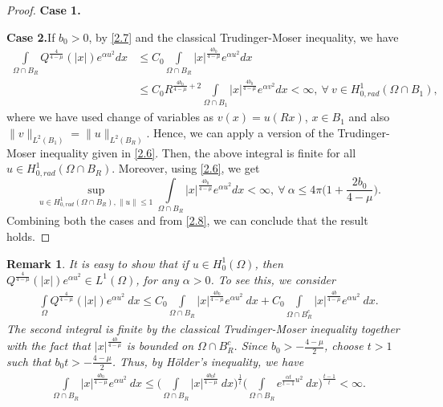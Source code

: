 \documentclass[11pt]{amsart}
\numberwithin{equation}{section}
\newtheorem{rem}{Remark}
\newenvironment{case}[1]{\par\noindent\textbf{Case 1.}\space#1}{}
\newenvironment{case2}[1]{\par\noindent\textbf{Case 2.}\space#1}{}
\newcommand{\h}{H^1_0(\Omega)}
\newcommand{\1}{\frac{1}{2}}
\begin{document}
\begin{proof}
\begin{case}
\begin{equation*}
			\end{equation*}
		\end{case}
		\begin{case2}
			If $b_0>0$, by \eqref{2.7} and the classical Trudinger-Moser inequality, we have
			\begin{align*}
				\int\limits_{\Omega \cap B_R} Q^{\frac{4}{4-\mu}}(|x|)e^{\alpha u^2}dx & \leq C_0\int\limits_{\Omega \cap B_R} |x|^{\frac{4b_0}{4-\mu}} e^{\alpha u^2}dx \\
				& \leq C_0 R^{\frac{4b_0}{4-\mu}+2}\int\limits_{\Omega \cap B_1} |x|^{\frac{4b_0}{4-\mu}} e^{\alpha v^2}dx <\infty, \ \forall \ v\in H^1_{0,rad}(\Omega \cap B_1),
			\end{align*}
			where we have used change of variables as $v(x)=u(Rx)$, $x\in B_1$ and also $\|v\|_{L^2(B_1)}=\|u\|_{L^2(B_R)}$. Hence, we can apply a version of the Trudinger-Moser inequality given in \eqref{2.6}. Then, the above integral is finite for all $u\in H^1_{0,rad}(\Omega \cap B_R)$. Moreover, using \eqref{2.6}, we get
			\begin{equation*} 
				\sup_{u\in H^1_{0,rad}(\Omega \cap B_R), \|u\|\leq 1} \int\limits_{\Omega \cap B_R} |x|^{\frac{4b_0}{4-\mu}}  e^{\alpha u^2} dx < \infty, \ \forall \ \alpha \leq 4\pi\Big(1+\frac{2b_0}{4-\mu}\Big).
			\end{equation*}
		\end{case2}
		Combining both the cases and from \eqref{2.8}, we can conclude that the result holds.
	\end{proof}
	\begin{rem}
		\label{rem1}
		It is easy to show that if $u\in \h$, then $Q^{\frac{4}{4-\mu}}(|x|)e^{\alpha u^2} \in L^1(\Omega)$, for any $\alpha>0$. To see this, we consider
		\begin{align}
			\label{2.9}
			\int\limits_\Omega Q^{\frac{4}{4-\mu}}(|x|)e^{\alpha u^2}\ dx \leq C_0\int\limits_{\Omega \cap B_R} |x|^{\frac{4b_0}{4-\mu}}e^{\alpha u^2}\ dx + C_0\int\limits_{\Omega \cap B_R^c} |x|^{\frac{4b}{4-\mu}}e^{\alpha u^2}\ dx.
		\end{align}
		The second integral is finite by the classical Trudinger-Moser inequality together with the fact that $|x|^{\frac{4b}{4-\mu}}$ is bounded on $\Omega \cap B_R^c$. Since $b_0>-\frac{4-\mu}{2}$, choose $t>1$ such that $b_0 t>-\frac{4-\mu}{2}$. Thus, by H\"older's inequality, we have
		\begin{align*}
			\int\limits_{\Omega \cap B_R} |x|^{\frac{4b_0}{4-\mu}}e^{\alpha u^2}\ dx \leq \Bigg( \int\limits_{\Omega \cap B_R} |x|^{\frac{4b_0t}{4-\mu}}\ dx\Bigg)^{\frac{1}{t}} \Bigg( \int\limits_{\Omega \cap B_R} e^{\frac{\alpha t}{t-1} u^2} \ dx\Bigg)^{\frac{t-1}{t}} < \infty.
		\end{align*}
	\end{rem}
\end{document}
